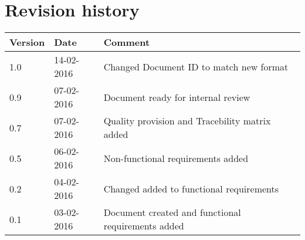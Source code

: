 \label{chp_revisionHistory}
\chapter{Revision history}

\begin{longtable}{| p{1.5cm}  | p{3cm} |  p{8cm} | }
	\hline
	\textbf{Version} & \textbf{Date} & \textbf{Comment} \\
    \hline
    1.0 & 14-02-2016 & Changed Document ID to match new format \\
    \hline
    0.9 & 07-02-2016 & Document ready for internal review \\
    \hline
    0.7 & 07-02-2016 & Quality provision and Tracebility matrix added \\
    \hline
    0.5 & 06-02-2016 & Non-functional requirements added \\
	\hline
	0.2 & 04-02-2016 & Changed added to functional requirements \\
    \hline
    0.1 & 03-02-2016 & Document created and functional requirements added  \\
    \hline
\end{longtable}

